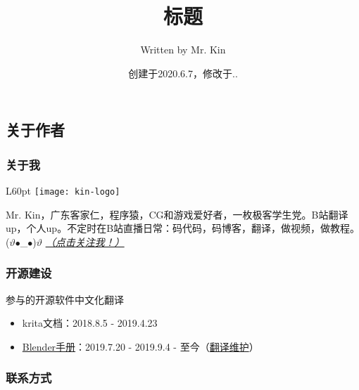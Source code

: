 \documentclass[11pt,a4paper,UTF8,titlepage]{ctexart} %
\title{\hypertarget{title}{\textbf{标题}}}
\author{Written by Mr. Kin}
\date{创建于2020.6.7，修改于\number\year.\number\month.\number\day}
\makeatletter
\renewcommand{\tableofcontents}%
  {\chapter{\contentsname}%
  \@mkboth{\MakeUppercase\contentsname}{\MakeUppercase\contentsname}%
  \@makeschapterhead{\sourcecodename}%
  \@starttoc{toc}%
}
\makeatother
\begin{document}
    \maketitle %
    {\centering \tableofcontents} %
    \clearpage %
    \fi

    \section*{\bfseries \sffamily 关于作者}

    \subsection*{\bfseries \sffamily 关于我}
    \begin{wrapfigure}[3]{L}{60pt}
        \vspace*{-20pt}
        \centering
        \texttt{[image: kin-logo]}
    \end{wrapfigure}
    Mr. Kin，广东客家仁，程序猿，CG和游戏爱好者，一枚极客学生党。B站翻译up，个人up。不定时在B站直播日常：码代码，码博客，翻译，做视频，做教程。 ($\vartheta$$\bullet$\_$\bullet$)$\vartheta$ \hyperlink{follow}{\emph{（点击关注我！）}}

    \subsection*{\bfseries \sffamily 开源建设}

    \noindent 参与的开源软件中文化翻译

    \begin{itemize}
        \item krita文档：2018.8.5 - 2019.4.23
        \item \href{https://www.blendercn.org/5812.html?tdsourcetag=s_pctim_aiomsg}{Blender手册}：2019.7.20 - 2019.9.4 - 至今（\href{https://developer.blender.org/p/Mr_Kin/}{翻译维护}）
    \end{itemize}

    \subsection*{\bfseries \sffamily \hypertarget{contact}{联系方式}}
    \vspace*{-1ex}
\end{document}
